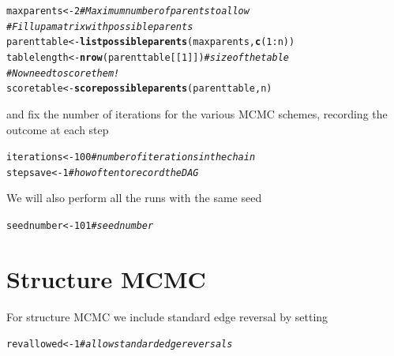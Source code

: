 \documentclass[a4paper]{article}\usepackage[]{graphicx}\usepackage[]{color}
\makeatletter
\newcommand{\hlnum}[1]{\textcolor[rgb]{0.686,0.059,0.569}{#1}}%
\newcommand{\hlcom}[1]{\textcolor[rgb]{0.678,0.584,0.686}{\textit{#1}}}%
\newcommand{\hlopt}[1]{\textcolor[rgb]{0,0,0}{#1}}%
\newcommand{\hlstd}[1]{\textcolor[rgb]{0.345,0.345,0.345}{#1}}%
\newcommand{\hlkwb}[1]{\textcolor[rgb]{0.69,0.353,0.396}{#1}}%
\newcommand{\hlkwd}[1]{\textcolor[rgb]{0.737,0.353,0.396}{\textbf{#1}}}%
\newenvironment{kframe}{%
 \def\at@end@of@kframe{}%
 \ifinner\ifhmode%
  \def\at@end@of@kframe{\end{minipage}}%
  \begin{minipage}{\columnwidth}%
 \fi\fi%
 \def\FrameCommand##1{\hskip\@totalleftmargin \hskip-\fboxsep
 \colorbox{shadecolor}{##1}\hskip-\fboxsep
     \hskip-\linewidth \hskip-\@totalleftmargin \hskip\columnwidth}%
 \MakeFramed {\advance\hsize-\width
   \@totalleftmargin\z@ \linewidth\hsize
   \@setminipage}}%
 {\par\unskip\endMakeFramed%
 \at@end@of@kframe}
\newenvironment{knitrout}{}{} %
\newcommand{\nn}{\noindent}
\makeatother
\begin{document}
\begin{knitrout}
\color{fgcolor}\begin{kframe}
\begin{alltt}
\hlstd{maxparents} \hlkwb{<-} \hlnum{2}  \hlcom{# Maximum number of parents to allow}
\hlcom{# Fill up a matrix with possible parents}
\hlstd{parenttable} \hlkwb{<-} \hlkwd{listpossibleparents}\hlstd{(maxparents,} \hlkwd{c}\hlstd{(}\hlnum{1}\hlopt{:}\hlstd{n))}
\hlstd{tablelength} \hlkwb{<-} \hlkwd{nrow}\hlstd{(parenttable[[}\hlnum{1}\hlstd{]])}  \hlcom{# size of the table}
\hlcom{# Now need to score them!}
\hlstd{scoretable} \hlkwb{<-} \hlkwd{scorepossibleparents}\hlstd{(parenttable, n)}
\end{alltt}
\end{kframe}
\end{knitrout}

\nn and fix the number of iterations for the various MCMC schemes, recording the outcome at each step

\begin{knitrout}
\color{fgcolor}\begin{kframe}
\begin{alltt}
\hlstd{iterations} \hlkwb{<-} \hlnum{100}  \hlcom{# number of iterations in the chain}
\hlstd{stepsave} \hlkwb{<-} \hlnum{1}  \hlcom{# how often to record the DAG}
\end{alltt}
\end{kframe}
\end{knitrout}

\nn We will also perform all the runs with the same seed

\begin{knitrout}
\color{fgcolor}\begin{kframe}
\begin{alltt}
\hlstd{seednumber} \hlkwb{<-} \hlnum{101}  \hlcom{# seed number}
\end{alltt}
\end{kframe}
\end{knitrout}

\section{Structure MCMC}

For structure MCMC we include standard edge reversal by setting

\begin{knitrout}
\color{fgcolor}\begin{kframe}
\begin{alltt}
\hlstd{revallowed} \hlkwb{<-} \hlnum{1}  \hlcom{# allow standard edge reversals}
\end{alltt}
\end{kframe}
\end{knitrout}
    
\end{document}

